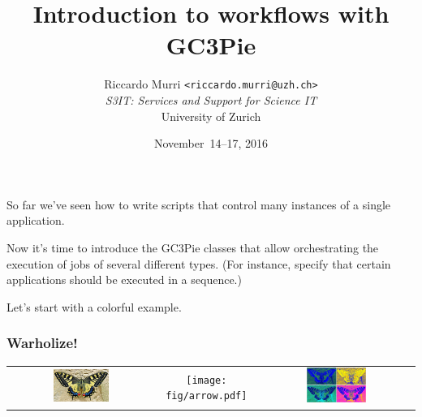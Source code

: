 \documentclass[english,serif,mathserif,xcolor=pdftex,dvipsnames,table]{beamer}
\title[Workflows]{%
  Introduction to workflows with GC3Pie
}
\author[R. Murri, S3IT UZH]{%
  Riccardo Murri \texttt{<riccardo.murri@uzh.ch>}
  \\[1ex]
  \emph{S3IT: Services and Support for Science IT}
  \\[1ex]
  University of Zurich
}
\date{November~14--17, 2016}
\begin{document}
\maketitle









\begin{frame}

  So far we've seen how to write scripts that control many instances of
  a single application.

  \+
  Now it's time to introduce the GC3Pie classes that allow
  orchestrating the execution of jobs of several different types. (For
  instance, specify that certain applications should be executed in a
  sequence.)

  \+
  Let's start with a colorful example.
\end{frame}


\begin{frame}
  \frametitle{Warholize!}

  \begin{tabular}[c]{ccc}
    \includegraphics[width=0.4\textwidth]{fig/butterfly.jpg}
    &
    {\texttt{[image: fig/arrow.pdf]}}
    &
    \includegraphics[width=0.4\textwidth]{fig/warholized-butterfly.jpg}
  \end{tabular}
\end{frame}
\end{document}
